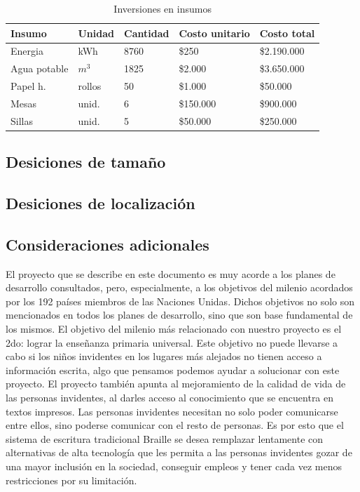 \documentclass[a4paper, 12pt, oneside]{article}
\begin{document}
	\begin{table}
		\caption{Inversiones en insumos}
		\begin{tabular}{ | p{2.5cm} | p{1.5cm} | p{1.5cm} | p{2cm} | p{2cm} | }
		\hline
		Insumo & Unidad & Cantidad & Costo unitario & Costo total \\
		\hline					
		Energia & kWh & 8760 & \$250 & \$2.190.000 \\
		\hline					
		Agua potable & $m^{3}$ & 1825 & \$2.000 & \$3.650.000 \\
		\hline
		Papel h. & rollos & 50 & \$1.000 & \$50.000 \\
		\hline
		Mesas & unid. & 6 & \$150.000 & \$900.000 \\
		\hline
		Sillas & unid. & 5 & \$50.000 & \$250.000 \\
		\hline
		\end{tabular}
		\label{tb:invInsumos}
	\end{table}
		
	\subsection{Desiciones de tamaño}
	
	\subsection{Desiciones de localización}
	
	
	
	\clearpage

	\begin{center}
	\section{Consideraciones adicionales}
	\end{center}

	El proyecto que se describe en este documento es muy acorde a los planes de desarrollo consultados, pero, especialmente, a los objetivos del milenio acordados por los 192 países miembros de las Naciones Unidas. Dichos objetivos no solo son mencionados en todos los planes de desarrollo, sino que son base fundamental de los mismos. El objetivo del milenio más relacionado con nuestro proyecto es el 2do: lograr la enseñanza primaria universal. Este objetivo no puede llevarse a cabo si los niños invidentes en los lugares más alejados no tienen acceso a información escrita, algo que pensamos podemos ayudar a solucionar con este proyecto.
	El proyecto también apunta al mejoramiento de la calidad de vida de las personas invidentes, al darles
	acceso al conocimiento que se encuentra en textos impresos. Las personas invidentes necesitan no solo
	poder comunicarse entre ellos, sino poderse comunicar con el resto de personas. Es por esto que el sistema
	de escritura tradicional Braille se desea remplazar lentamente con alternativas de alta tecnología
	que les permita a las personas invidentes gozar de una mayor inclusión en la sociedad, conseguir empleos
	y tener cada vez menos restricciones por su limitación.
	
\end{document}
